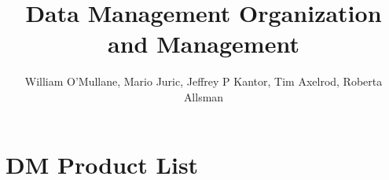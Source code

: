 \documentclass[DM,lsstdraft,SDP,toc]{lsstdoc}
\begin{document}
\title[DM PMP]{Data Management Organization and Management }

\author   {William O'Mullane, Mario Juric, Jeffrey P Kantor,  Tim Axelrod,  Roberta Allsman}                %
\setDocDate     {\today}              %

%
%

%
%
\maketitle

%
%










\appendix
\section{DM Product List \label{sect:prodlist}}


%

\end{document}
